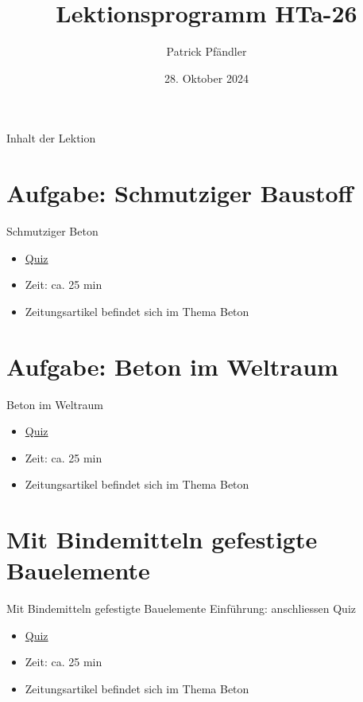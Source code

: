 

\title{\textbf{Lektionsprogramm HTa-26}}
\author{Patrick Pfändler}
\date{28. Oktober 2024}




\frame{\titlepage}

\begin{frame}{Inhalt der Lektion}
    \tableofcontents
\end{frame}


\section{Aufgabe: Schmutziger Baustoff}

\begin{frame}{Schmutziger Beton}
\begin{itemize}
	\item \href{https://www.classtime.com/code/8UH5E9}{Quiz}
	\item Zeit: ca. 25 min
	\item Zeitungsartikel befindet sich im Thema Beton
\end{itemize}
\end{frame}

%
\section{Aufgabe:  Beton im Weltraum}
\begin{frame}{Beton im Weltraum}
\begin{itemize}
	\item \href{https://www.classtime.com/code/286Y96}{Quiz}
	\item Zeit: ca. 25 min
	\item Zeitungsartikel befindet sich im Thema Beton
\end{itemize}
\end{frame}

\section{Mit Bindemitteln gefestigte Bauelemente }
\begin{frame}{Mit Bindemitteln gefestigte Bauelemente }
Einführung: anschliessen Quiz
\begin{itemize}
	\item \href{https://www.classtime.com/code/AH2ZVJ}{Quiz}
	\item Zeit: ca. 25 min
	\item Zeitungsartikel befindet sich im Thema Beton
\end{itemize}
\end{frame}

